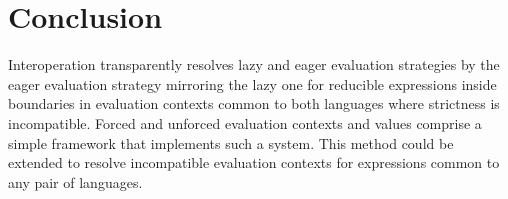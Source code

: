 \section{Conclusion}

Interoperation transparently resolves lazy and eager evaluation strategies by the eager evaluation strategy mirroring the lazy one for reducible expressions inside boundaries in evaluation contexts common to both languages where strictness is incompatible. Forced and unforced evaluation contexts and values comprise a simple framework that implements such a system. This method could be extended to resolve incompatible evaluation contexts for expressions common to any pair of languages.